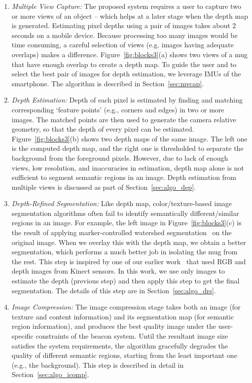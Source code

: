 \begin{enumerate} %
	\vspace{.5em}
	\item \textit{Multiple View Capture:} The proposed system requires a user to capture two or more views of an object -- which helps at a later stage when the depth map is generated. Estimating pixel depths using a pair of images takes about 2 seconds on a mobile device. Because processing too many images would be time consuming, a careful selection of views (e.g. images having adequate overlaps) makes a difference. Figure~\ref{fig:blocks3}(a) shows two views of a mug that have enough overlap to create a depth map. To guide the user and to select the best pair of images for depth estimation, we leverage IMUs of the smartphone. The algorithm is described in Section~\ref{sec:mvcap}.
	\vspace{.5em}
	\item \textit{Depth Estimation:} Depth of each pixel is estimated by finding and matching corresponding `feature points' (e.g., corners and edges) in two or more images. The matched points are then used to generate the camera relative geometry, so that the depth of every pixel can be estimated. Figure~\ref{fig:blocks3}(b) shows two depth maps of the same image. The left one is the computed depth map, and the right one is thresholded to separate the background from the foreground pixels. However, due to lack of enough views, low resolution, and inaccuracies in estimation, depth map alone is not sufficient to segment semantic regions in an image. Depth estimation from multiple views is discussed as part of Section~\ref{sec:algo_dep}.
	\vspace{.5em}
	\item \textit{Depth-Refined Segmentation:} Like depth map, color/texture-based image segmentation algorithms often fail to identify semantically different/similar regions in an image. For example, the left image in Figure~\ref{fig:blocks3}(c) is the result of applying marker-controlled watershed segmentation~\cite{parvati2009image} on the original image. When we overlay this with the depth map, we obtain a better segmentation, which performs a much better job in isolating the mug from the rest. This step is inspired by one of our earlier work~\cite{nirjon2012kinsight} that used RGB and depth images from Kinect sensors. In this work, we use only images to estimate the depth (previous step) and then apply this step to get the final segmentation. The details of this step are in Section~\ref{sec:algo_drs}.
	\vspace{.5em}
	\item \textit{Image Compression:} The image compression stage takes both an image (for texture and content information) and its segmentation map (for semantic region information), and produces the best quality image under the user-specific constraints of the beacon system. Until the resultant image size satisfies the system requirements, the algorithm gracefully degrades the quality of different semantic regions, starting from the least important one (e.g., the background). This step is described in detail in Section~\ref{sec:algo_icomp}.
\end{enumerate}


